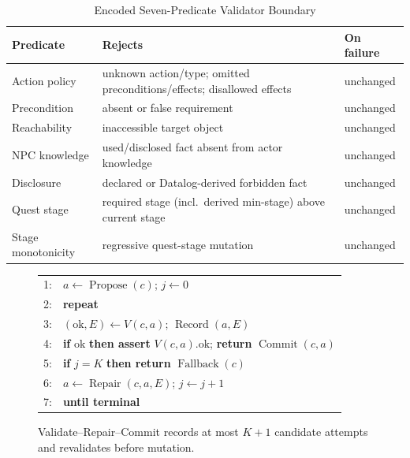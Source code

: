 \begin{table}[!tbp]
\caption{Encoded Seven-Predicate Validator Boundary}
\label{tab:validators}
\centering
\footnotesize
\begin{tabularx}{\columnwidth}{@{}>{\raggedright\arraybackslash}p{}>{\raggedright\arraybackslash}X>{\raggedright\arraybackslash}p{}@{}}
\toprule
\textbf{Predicate} & \textbf{Rejects} & \textbf{On failure} \\
\midrule
Action policy & unknown action/type; omitted preconditions/effects; disallowed effects & unchanged \\
Precondition & absent or false requirement & unchanged \\
Reachability & inaccessible target object & unchanged \\
NPC knowledge & used/disclosed fact absent from actor knowledge & unchanged \\
Disclosure & declared or Datalog-derived forbidden fact & unchanged \\
Quest stage & required stage (incl.\ derived min-stage) above current stage & unchanged \\
Stage monotonicity & regressive quest-stage mutation & unchanged \\
\bottomrule
\end{tabularx}
\end{table}

\begin{figure}[!tbp]
\centering
\footnotesize
\begin{tabular}{@{}rl@{}}
1: & $a\leftarrow\operatorname{Propose}(c)$; $j\leftarrow0$ \\
2: & \textbf{repeat} \\
3: & \quad $(\mathrm{ok},E)\leftarrow V(c,a)$; $\operatorname{Record}(a,E)$ \\
4: & \quad \textbf{if} $\mathrm{ok}$ \textbf{then assert} $V(c,a).\mathrm{ok}$; \textbf{return} $\operatorname{Commit}(c,a)$ \\
5: & \quad \textbf{if} $j=K$ \textbf{then return} $\operatorname{Fallback}(c)$ \\
6: & \quad $a\leftarrow\operatorname{Repair}(c,a,E)$; $j\leftarrow j+1$ \\
7: & \textbf{until terminal}
\end{tabular}
\caption{Validate--Repair--Commit records at most $K+1$ candidate attempts and revalidates before mutation.}
\label{alg:commit}
\end{figure}

